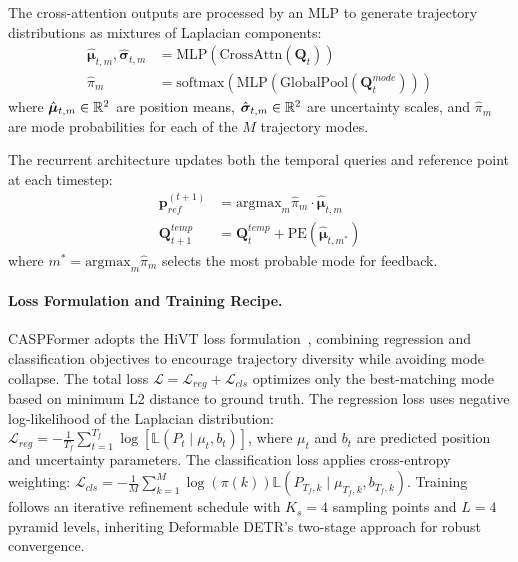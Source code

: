 \begin{description}[leftmargin=1em,itemsep=2pt]
\begin{description}[leftmargin=1em,itemsep=2pt]
\item[Autoregressive Decoding with Mixture Outputs.] The cross-attention outputs are processed by an MLP to generate trajectory distributions as mixtures of Laplacian components:
\begin{equation}
\label{eq:mixture_trajectory_output}
\begin{aligned}
\hat{\boldsymbol{\mu}}_{t,m}, \hat{\boldsymbol{\sigma}}_{t,m} &= \text{MLP}(\text{CrossAttn}(\mathbf{Q}_t)) \\
\hat{\pi}_m &= \text{softmax}(\text{MLP}(\text{GlobalPool}(\mathbf{Q}_t^{mode})))
\end{aligned}
\end{equation}
where \(\hat{\boldsymbol{\mu}}_{t,m} \in \mathbb{R}^2\) are position means, \(\hat{\boldsymbol{\sigma}}_{t,m} \in \mathbb{R}^2\) are uncertainty scales, and \(\hat{\pi}_m\) are mode probabilities for each of the \(M\) trajectory modes.

The recurrent architecture updates both the temporal queries and reference point at each timestep:
\begin{equation}
\label{eq:recurrent_updates}
\begin{aligned}
\mathbf{p}_{ref}^{(t+1)} &= \text{argmax}_m \hat{\pi}_m \cdot \hat{\boldsymbol{\mu}}_{t,m} \\
\mathbf{Q}_{t+1}^{temp} &= \mathbf{Q}_t^{temp} + \text{PE}(\hat{\boldsymbol{\mu}}_{t,m^*})
\end{aligned}
\end{equation}
where \(m^* = \text{argmax}_m \hat{\pi}_m\) selects the most probable mode for feedback.
\end{description}

\paragraph{Loss Formulation and Training Recipe.} CASPFormer adopts the HiVT loss formulation~\cite{zhou2022hivt}, combining regression and classification objectives to encourage trajectory diversity while avoiding mode collapse. The total loss \(\mathcal{L} = \mathcal{L}_{reg} + \mathcal{L}_{cls}\) optimizes only the best-matching mode based on minimum L2 distance to ground truth. The regression loss uses negative log-likelihood of the Laplacian distribution: \(\mathcal{L}_{reg} = -\frac{1}{T_f} \sum_{t=1}^{T_f} \log[\mathbb{L}(P_t \mid \mu_t, b_t)]\), where \(\mu_t\) and \(b_t\) are predicted position and uncertainty parameters. The classification loss applies cross-entropy weighting: \(\mathcal{L}_{cls} = -\frac{1}{M} \sum_{k=1}^{M} \log(\pi(k)) \mathbb{L}(P_{T_f, k} \mid \mu_{T_f, k}, b_{T_f, k})\). Training follows an iterative refinement schedule with \(K_s = 4\) sampling points and \(L = 4\) pyramid levels, inheriting Deformable DETR's two-stage approach for robust convergence.


\end{description}
